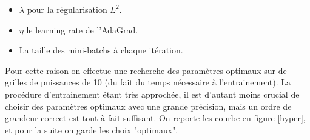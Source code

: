 \documentclass[conference]{IEEEtran}
\begin{document}
\begin{itemize}
\item $\lambda$ pour la régularisation $L^2$.
\item $\eta$ le learning rate de l'AdaGrad.
\item La taille des mini-batchs à chaque itération.
\end{itemize}

Pour cette raison on effectue une recherche des paramètres optimaux sur de grilles de puissances de 10 (du fait du temps nécessaire à l'entrainement). La procédure d'entrainement étant très approchée, il est d'autant moins crucial de choisir des paramètres optimaux avec une grande précision, mais un ordre de grandeur correct est tout à fait suffisant. On reporte les courbe en figure \ref{hyper}, et pour la suite on garde les choix "optimaux".
\end{document}
